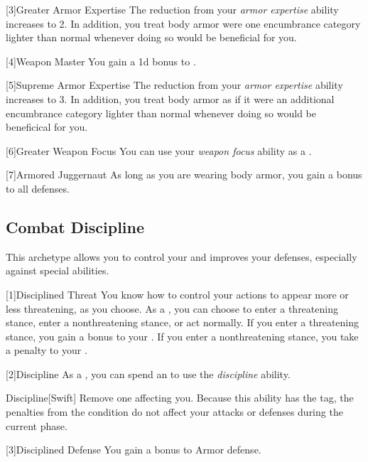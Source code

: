         [3]{Greater Armor Expertise}
        The  reduction from your \textit{armor expertise} ability increases to 2.
        In addition, you treat body armor were one encumbrance category lighter than normal whenever doing so would be beneficial for you.

        [4]{Weapon Master} 
        You gain a \plus1d bonus to .

        [5]{Supreme Armor Expertise}
        The  reduction from your \textit{armor expertise} ability increases to 3.
        In addition, you treat body armor as if it were an additional encumbrance category lighter than normal whenever doing so would be beneficical for you.

        [6]{Greater Weapon Focus} You can use your \textit{weapon focus} ability as a .

        [7]{Armored Juggernaut}
        As long as you are wearing body armor, you gain a  bonus to all defenses.

    \subsection{Combat Discipline}
        This archetype allows you to control your  and improves your defenses, especially against special abilities.

        [1]{Disciplined Threat}
        You know how to control your actions to appear more or less threatening, as you choose.
        As a , you can choose to enter a threatening stance, enter a nonthreatening stance, or act normally.
        If you enter a threatening stance, you gain a  bonus to your .
        If you enter a nonthreatening stance, you take a  penalty to your .

        [2]{Discipline} As a , you can spend an  to use the \textit{discipline} ability.
        \begin{ability}{Discipline}[Swift]
            Remove one  affecting you.
            Because this ability has the  tag, the penalties from the condition do not affect your attacks or defenses during the current phase.
        \end{ability}

        [3]{Disciplined Defense}
        You gain a  bonus to Armor defense.

